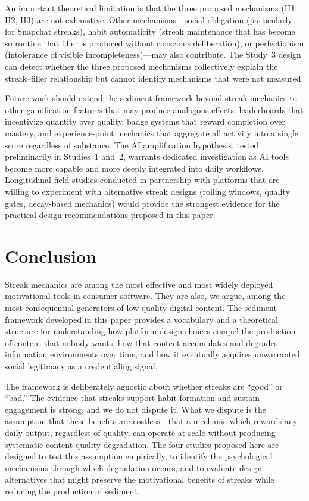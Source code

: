 \documentclass[12pt]{article}
\begin{document}
An important theoretical limitation is that the three proposed mechanisms (H1, H2, H3) are not exhaustive. Other mechanisms---social obligation (particularly for Snapchat streaks), habit automaticity (streak maintenance that has become so routine that filler is produced without conscious deliberation), or perfectionism (intolerance of visible incompleteness)---may also contribute. The Study~3 design can detect whether the three proposed mechanisms collectively explain the streak--filler relationship but cannot identify mechanisms that were not measured.

Future work should extend the sediment framework beyond streak mechanics to other gamification features that may produce analogous effects: leaderboards that incentivize quantity over quality, badge systems that reward completion over mastery, and experience-point mechanics that aggregate all activity into a single score regardless of substance. The AI amplification hypothesis, tested preliminarily in Studies~1 and~2, warrants dedicated investigation as AI tools become more capable and more deeply integrated into daily workflows. Longitudinal field studies conducted in partnership with platforms that are willing to experiment with alternative streak designs (rolling windows, quality gates, decay-based mechanics) would provide the strongest evidence for the practical design recommendations proposed in this paper.

\section{Conclusion}
\label{sec:conclusion}

Streak mechanics are among the most effective and most widely deployed motivational tools in consumer software. They are also, we argue, among the most consequential generators of low-quality digital content. The sediment framework developed in this paper provides a vocabulary and a theoretical structure for understanding how platform design choices compel the production of content that nobody wants, how that content accumulates and degrades information environments over time, and how it eventually acquires unwarranted social legitimacy as a credentialing signal.

The framework is deliberately agnostic about whether streaks are ``good'' or ``bad.'' The evidence that streaks support habit formation and sustain engagement is strong, and we do not dispute it. What we dispute is the assumption that these benefits are costless---that a mechanic which rewards any daily output, regardless of quality, can operate at scale without producing systematic content quality degradation. The four studies proposed here are designed to test this assumption empirically, to identify the psychological mechanisms through which degradation occurs, and to evaluate design alternatives that might preserve the motivational benefits of streaks while reducing the production of sediment.
\end{document}
